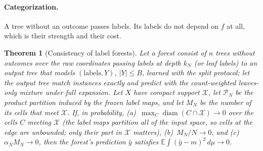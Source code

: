 \documentclass[11pt]{article}
\newtheorem{theorem}{Theorem}
\theoremstyle{definition}
\theoremstyle{remark}
\newcommand{\E}{\mathbb{E}}
\newcommand{\hy}{\hat{y}}
\newcommand{\diam}{\operatorname{diam}}
\begin{document}
\paragraph{Categorization.}
A tree without an outcome passes labels.  Its labels do not depend on $f$ at all, which
is their strength and their cost.

\begin{theorem}[Consistency of label forests]\label{thm:labelcons}
Let a forest consist of $n$ trees without outcomes over the raw coordinates passing labels
at depth $k_N$ (or leaf labels) to an output tree that models $(\text{labels},Y)$, $|Y|\le B$,
learned with the split protocol; let the output tree match instances exactly and
predict with the count-weighted leaves-only mixture under full expansion.  Let $X$ have
compact support $\mathcal X$, let $\mathcal P_N$ be the product partition induced by the
frozen label maps, and let $M_N$ be the number of its cells that meet $\mathcal X$.  If,
in probability, (a)~$\max_C\diam(C\cap\mathcal X)\to0$ over the cells $C$ meeting $\mathcal X$ (the label
maps partition all of the input space, so cells at the edge are unbounded; only their part
in $\mathcal X$ matters),
(b)~$M_N/N\to0$, and (c)~$\alpha_NM_N\to0$, then the forest's prediction $\hy$ satisfies
$\E\int(\hy-m)^2\,d\mu\to0$.
\end{theorem}
\end{document}
